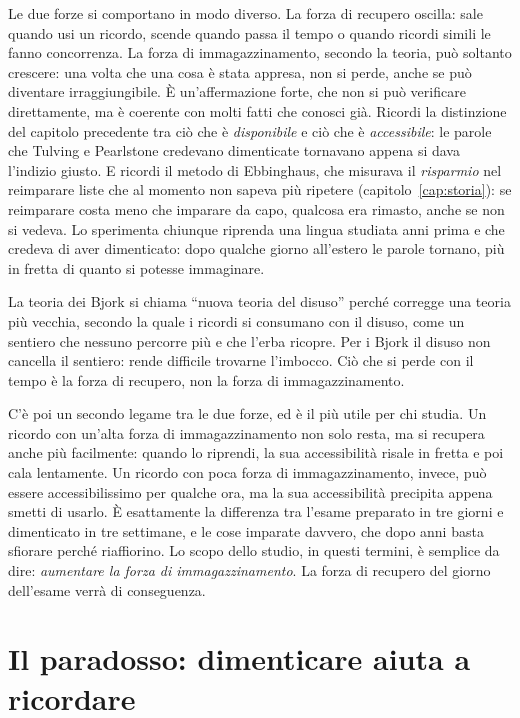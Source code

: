 Le due forze si comportano in modo diverso. La forza di recupero
oscilla: sale quando usi un ricordo, scende quando passa il tempo o
quando ricordi simili le fanno concorrenza. La forza di
immagazzinamento, secondo la teoria, può soltanto crescere: una volta
che una cosa è stata appresa, non si perde, anche se può diventare
irraggiungibile. È un'affermazione forte, che non si può verificare
direttamente, ma è coerente con molti fatti che conosci già. Ricordi
la distinzione del capitolo precedente tra ciò che è \emph{disponibile}
e ciò che è \emph{accessibile}: le parole che Tulving e Pearlstone
credevano dimenticate tornavano appena si dava l'indizio giusto. E
ricordi il metodo di Ebbinghaus, che misurava il \emph{risparmio} nel
reimparare liste che al momento non sapeva più ripetere
(capitolo~\ref{cap:storia}): se reimparare costa meno che imparare da
capo, qualcosa era rimasto, anche se non si vedeva. Lo sperimenta
chiunque riprenda una lingua studiata anni prima e che credeva di aver
dimenticato: dopo qualche giorno all'estero le parole tornano, più in
fretta di quanto si potesse immaginare.

La teoria dei Bjork si chiama \enquote{nuova teoria del disuso} perché
corregge una teoria più vecchia, secondo la quale i ricordi si
consumano con il disuso, come un sentiero che nessuno percorre più e
che l'erba ricopre. Per i Bjork il disuso non cancella il sentiero:
rende difficile trovarne l'imbocco. Ciò che si perde con il tempo è la
forza di recupero, non la forza di immagazzinamento.

C'è poi un secondo legame tra le due forze, ed è il più utile per chi
studia. Un ricordo con un'alta forza di immagazzinamento non solo
resta, ma si recupera anche più facilmente: quando lo riprendi, la sua
accessibilità risale in fretta e poi cala lentamente. Un ricordo con
poca forza di immagazzinamento, invece, può essere accessibilissimo per
qualche ora, ma la sua accessibilità precipita appena smetti di usarlo.
È esattamente la differenza tra l'esame preparato in tre giorni e
dimenticato in tre settimane, e le cose imparate davvero, che dopo anni
basta sfiorare perché riaffiorino. Lo scopo dello studio, in questi
termini, è semplice da dire: \emph{aumentare la forza di
immagazzinamento}. La forza di recupero del giorno dell'esame verrà di
conseguenza.

\section{Il paradosso: dimenticare aiuta a ricordare}

